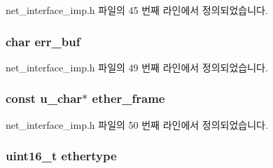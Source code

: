 net\+\_\+interface\+\_\+imp.\+h 파일의 45 번째 라인에서 정의되었습니다.

\subsubsection[{\texorpdfstring{err\+\_\+buf}{err_buf}}]{\setlength{\rightskip}{0pt plus 5cm}char err\+\_\+buf\hspace{0.3cm}{\ttfamily [private]}}\hypertarget{classavdecc__lib_1_1net__interface__imp_af8607f378f68a61a48fb0744883f3e77}{}\label{classavdecc__lib_1_1net__interface__imp_af8607f378f68a61a48fb0744883f3e77}


net\+\_\+interface\+\_\+imp.\+h 파일의 49 번째 라인에서 정의되었습니다.

\subsubsection[{\texorpdfstring{ether\+\_\+frame}{ether_frame}}]{\setlength{\rightskip}{0pt plus 5cm}const u\+\_\+char$\ast$ ether\+\_\+frame\hspace{0.3cm}{\ttfamily [private]}}\hypertarget{classavdecc__lib_1_1net__interface__imp_a446d7049f03f1ab66502601e8cbf7180}{}\label{classavdecc__lib_1_1net__interface__imp_a446d7049f03f1ab66502601e8cbf7180}


net\+\_\+interface\+\_\+imp.\+h 파일의 50 번째 라인에서 정의되었습니다.

\subsubsection[{\texorpdfstring{ethertype}{ethertype}}]{\setlength{\rightskip}{0pt plus 5cm}uint16\+\_\+t ethertype\hspace{0.3cm}{\ttfamily [private]}}\hypertarget{classavdecc__lib_1_1net__interface__imp_aa9296c58dc24c63c4ee927db394a97d7}{}\label{classavdecc__lib_1_1net__interface__imp_aa9296c58dc24c63c4ee927db394a97d7}


